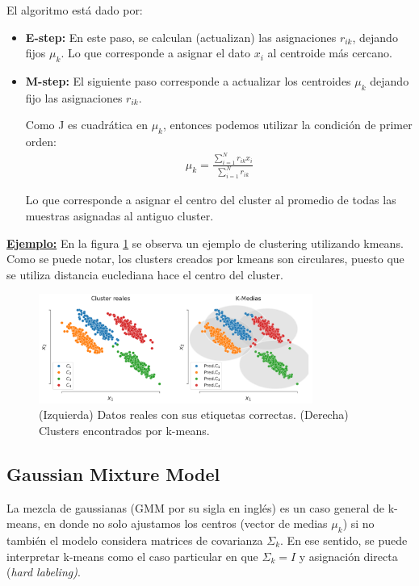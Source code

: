El algoritmo está dado por:

\begin{itemize}
    \item \textbf{E-step:} En este paso, se calculan (actualizan) las asignaciones $r_{ik}$, dejando fijos $\mu_k$. Lo que corresponde a asignar el dato $x_i$ al centroide más cercano.
    \item \textbf{M-step:} El siguiente paso corresponde a actualizar los centroides $\mu_k$ dejando fijo las asignaciones $r_{ik}$.
    
    Como J es cuadrática en $\mu_k$, entonces podemos utilizar la condición de primer orden:
    \begin{align}
        \mu_k = \frac{\sum_{i=1}^N r_{ik}x_i}{\sum_{i=1}^N r_{ik}}
    \end{align}
    
    Lo que corresponde a asignar el centro del cluster al promedio de todas las muestras asignadas al antiguo cluster.
\end{itemize}

\underline{\textbf{Ejemplo:}} En la figura \ref{fig:kmeans} se observa un ejemplo de clustering utilizando kmeans. Como se puede notar, los clusters creados por kmeans son circulares, puesto que se utiliza distancia euclediana hace el centro del cluster.

\begin{figure}[ht]
  \centering
  \includegraphics[width=0.8\textwidth]{img/cap7_k_medias}
  \caption{(Izquierda) Datos reales con sus etiquetas correctas. (Derecha) Clusters encontrados por k-means.}
  \label{fig:kmeans}
\end{figure}

\subsection{Gaussian Mixture Model}

La mezcla de gaussianas (GMM por su sigla en inglés) es un caso general de k-means, en donde no solo ajustamos los centros (vector de medias $\mu_k$) si no también el modelo considera matrices de covarianza $\Sigma_k$. En ese sentido, se puede interpretar k-means como el caso particular en que $\Sigma_k = I$ y asignación directa (\emph{hard labeling)}.

